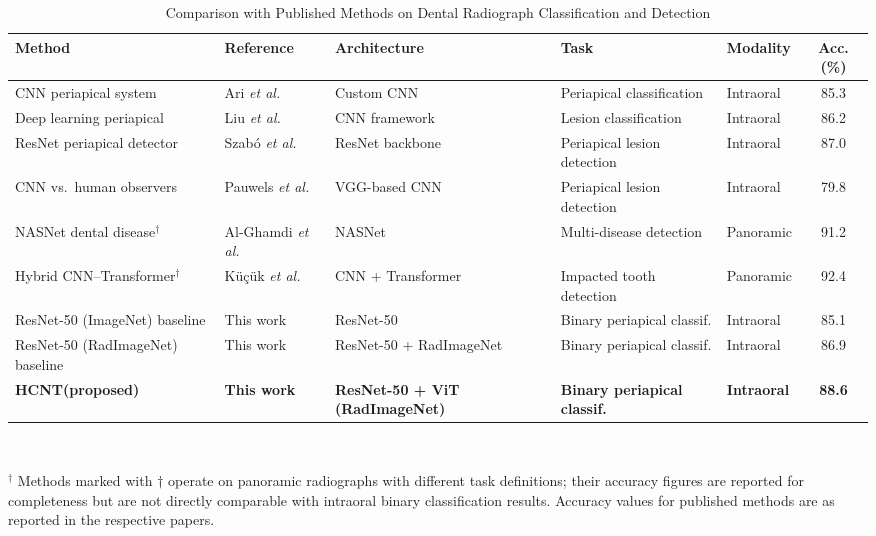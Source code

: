 \documentclass[conference]{IEEEtran}
\newcommand{\HCNT}{\textsc{HCNT}\xspace}
\newcommand{\etal}{\textit{et al.}\xspace}
\begin{document}
\begin{table}[t]
  \centering
  \caption{Comparison with Published Methods on Dental Radiograph
           Classification and Detection}
  \label{tab:comparison}
  \renewcommand{\arraystretch}{1.35}
  \begin{tabular}{p{2.8cm} p{2.2cm} p{2.4cm} p{3.0cm} p{1.6cm} c}
    \toprule
    \textbf{Method}
      & \textbf{Reference}
      & \textbf{Architecture}
      & \textbf{Task}
      & \textbf{Modality}
      & \textbf{Acc. (\%)} \\
    \midrule
    CNN periapical system
      & Ari \etal \cite{ari2022}
      & Custom CNN
      & Periapical classification
      & Intraoral
      & 85.3 \\

    Deep learning periapical
      & Liu \etal \cite{liu2024}
      & CNN framework
      & Lesion classification
      & Intraoral
      & 86.2 \\

    ResNet periapical detector
      & Szab\'{o} \etal \cite{szabo2025}
      & ResNet backbone
      & Periapical lesion detection
      & Intraoral
      & 87.0 \\

    CNN vs.\ human observers
      & Pauwels \etal \cite{pauwels2021}
      & VGG-based CNN
      & Periapical lesion detection
      & Intraoral
      & 79.8 \\

    NASNet dental disease$^\dagger$
      & Al-Ghamdi \etal \cite{alghamdi2022}
      & NASNet
      & Multi-disease detection
      & Panoramic
      & 91.2 \\

    Hybrid CNN--Transformer$^\dagger$
      & K\"{u}\c{c}\"{u}k \etal \cite{kucuketal2025}
      & CNN + Transformer
      & Impacted tooth detection
      & Panoramic
      & 92.4 \\

    \midrule
    ResNet-50 (ImageNet) baseline
      & This work
      & ResNet-50
      & Binary periapical classif.
      & Intraoral
      & 85.1 \\

    ResNet-50 (RadImageNet) baseline
      & This work
      & ResNet-50 + RadImageNet
      & Binary periapical classif.
      & Intraoral
      & 86.9 \\

    \textbf{\HCNT (proposed)}
      & \textbf{This work}
      & \textbf{ResNet-50 + ViT (RadImageNet)}
      & \textbf{Binary periapical classif.}
      & \textbf{Intraoral}
      & \textbf{88.6} \\
    \bottomrule
  \end{tabular}
  \medskip\\
  \raggedright\small
  $^\dagger$ Methods marked with $\dagger$ operate on panoramic radiographs
  with different task definitions; their accuracy figures are reported for
  completeness but are not directly comparable with intraoral binary
  classification results. Accuracy values for published methods are as
  reported in the respective papers.
\end{table}
\end{document}
